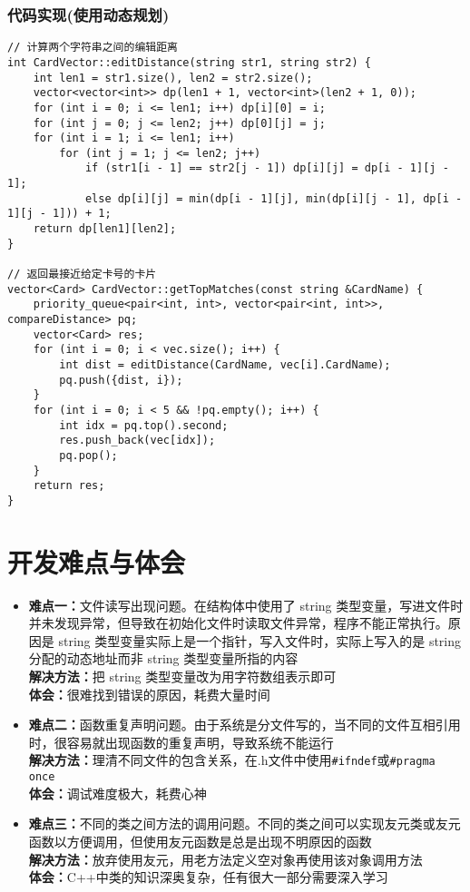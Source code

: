 \documentclass[UTF8]{ctexart}
\begin{document}
	\subsubsection{代码实现(使用动态规划)}
	\begin{lstlisting}
// 计算两个字符串之间的编辑距离
int CardVector::editDistance(string str1, string str2) {
    int len1 = str1.size(), len2 = str2.size();
    vector<vector<int>> dp(len1 + 1, vector<int>(len2 + 1, 0));
    for (int i = 0; i <= len1; i++) dp[i][0] = i;
    for (int j = 0; j <= len2; j++) dp[0][j] = j;
    for (int i = 1; i <= len1; i++)
        for (int j = 1; j <= len2; j++)
            if (str1[i - 1] == str2[j - 1]) dp[i][j] = dp[i - 1][j - 1];
            else dp[i][j] = min(dp[i - 1][j], min(dp[i][j - 1], dp[i - 1][j - 1])) + 1;
    return dp[len1][len2];
}

// 返回最接近给定卡号的卡片
vector<Card> CardVector::getTopMatches(const string &CardName) {
    priority_queue<pair<int, int>, vector<pair<int, int>>, compareDistance> pq;
    vector<Card> res;
    for (int i = 0; i < vec.size(); i++) {
        int dist = editDistance(CardName, vec[i].CardName);
        pq.push({dist, i});
    }
    for (int i = 0; i < 5 && !pq.empty(); i++) {
        int idx = pq.top().second;
        res.push_back(vec[idx]);
        pq.pop();
    }
    return res;
}
	\end{lstlisting}
	\section{开发难点与体会}
	\begin{itemize}[leftmargin=3em]
		\item {\bfseries 难点一：}文件读写出现问题。在结构体中使用了 string 类型变量，写进文件时并未发现异常，但导致在初始化文件时读取文件异常，程序不能正常执行。原因是 string 类型变量实际上是一个指针，写入文件时，实际上写入的是 string 分配的动态地址而非 string 类型变量所指的内容 \\
		{\bfseries 解决方法：}把 string 类型变量改为用字符数组表示即可 \\
		{\bfseries 体会：}很难找到错误的原因，耗费大量时间
		\item {\bfseries 难点二：}函数重复声明问题。由于系统是分文件写的，当不同的文件互相引用时，很容易就出现函数的重复声明，导致系统不能运行 \\
		{\bfseries 解决方法：}理清不同文件的包含关系，在.h文件中使用\lstinline{#ifndef}或\lstinline{#pragma once} \\
		{\bfseries 体会：}调试难度极大，耗费心神
		\item {\bfseries 难点三：}不同的类之间方法的调用问题。不同的类之间可以实现友元类或友元函数以方便调用，但使用友元函数是总是出现不明原因的函数 \\
		{\bfseries 解决方法：}放弃使用友元，用老方法定义空对象再使用该对象调用方法 \\
		{\bfseries 体会：}C++中类的知识深奥复杂，任有很大一部分需要深入学习
	\end{itemize}
	
\end{document}
